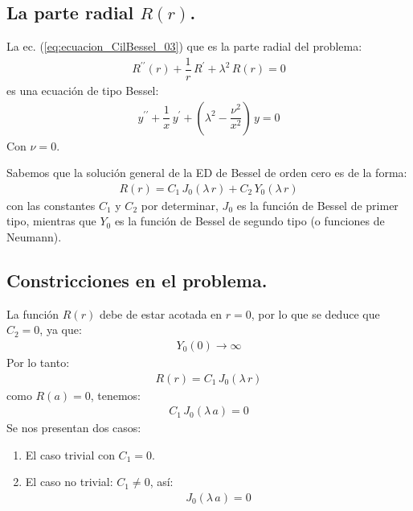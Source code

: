 \documentclass[12pt]{article}
\newcommand{\pderivada}[1]{\ensuremath{{#1}^{\prime}}}
\newcommand{\sderivada}[1]{\ensuremath{{#1}^{\prime \prime}}}
\numberwithin{equation}{section}
\begin{document}
\subsection{La parte radial \texorpdfstring{$R (r)$}{R (r)}.}

La ec. (\ref{eq:ecuacion_CilBessel_03}) que es la parte radial del problema:
\begin{align*}
\sderivada{R} (r) + \dfrac{1}{r} \, \pderivada{R} + \lambda^{2} \, R (r) = 0
\end{align*}
es una ecuación de tipo Bessel:
\begin{align*}
\sderivada{y} + \dfrac{1}{x} \, \pderivada{y} + \left( \lambda^{2} - \dfrac{\nu^{2}}{x^{2}} \right) \, y = 0
\end{align*}
Con $\nu = 0$.
\par
Sabemos que la solución general de la ED de Bessel de orden cero es de la forma:
\begin{align*}
R (r) = C_{1} \, J_{0} (\lambda \, r) + C_{2} \, Y_{0} (\lambda \, r)
\end{align*}
con las constantes $C_{1}$ y $C_{2}$ por determinar, $J_{0}$ es la función de Bessel de primer tipo, mientras que $Y_{0}$ es la función de Bessel de segundo tipo (o funciones de Neumann).

\subsection{Constricciones en el problema.}

La función $R (r)$ debe de estar acotada en $r = 0$,  por lo que se deduce que $C_{2} = 0$, ya que:
\begin{align*}
Y_{0} (0) \to \infty
\end{align*}
Por lo tanto:
\begin{align*}
R (r) = C_{1} \, J_{0} (\lambda \, r)
\end{align*}
como $R (a) = 0$, tenemos:
\begin{align*}
C_{1} \, J_{0} (\lambda \, a) = 0
\end{align*}
Se nos presentan dos casos:
\begin{enumerate}[label=\alph*)]
\item El caso trivial con $C_{1} = 0$.
\item El caso no trivial: $C_{1} \neq 0$, así:
\begin{align}
J_{0} (\lambda \, a) = 0
\label{eq:ecuacion_CilBessel_05}
\end{align}
\end{enumerate}
\end{document}
